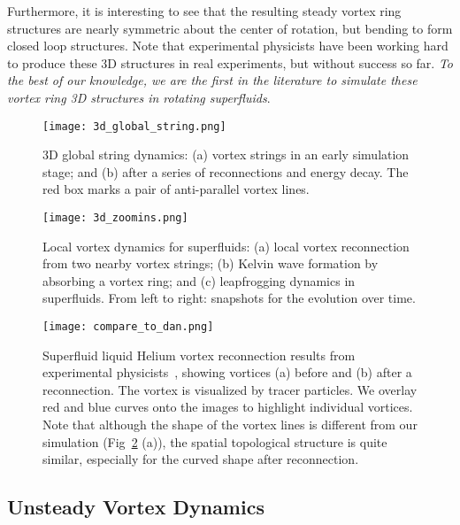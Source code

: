 \documentclass[10pt,journal,compsoc,twoside]{IEEEtran}
\newcommand{\bl}[1]{{\color{black}{#1}}}
\begin{document}
	Furthermore, it is interesting to see that the resulting steady vortex ring structures are nearly symmetric about the center of rotation, but bending to form closed loop structures.
	Note that experimental physicists have been working hard to produce these 3D structures in real experiments, but without success so far.
	\textit{To the best of our knowledge, we are the first in the literature to simulate these vortex ring 3D structures in rotating superfluids}.
	
	
	
	\begin{figure}[!t]
		\centering
		\texttt{[image: 3d\_global\_string.png]}
		\caption{3D global string dynamics:
			(a) vortex strings in an early simulation stage; and
			(b) after a series of reconnections and energy decay.
			The red box \bl{in (a)} marks a pair of anti-parallel vortex lines.}
		\label{fig:3d_global_string}
	\end{figure}
	
	\begin{figure}[!t]
		\centering
		\texttt{[image: 3d\_zoomins.png]}
		\caption{Local vortex dynamics for superfluids:
			(a) local vortex reconnection from two nearby vortex strings;
			(b) Kelvin wave formation by absorbing \bl{energy from} a vortex ring; and
			(c) leapfrogging dynamics in superfluids.
			From left to right: snapshots for the evolution over time.}
		\label{fig:3d_zoomins}
	\end{figure}
	
	\begin{figure}[!t]
		\centering
		\texttt{[image: compare\_to\_dan.png]}
		\caption{Superfluid liquid Helium vortex reconnection results from experimental physicists~\cite{Dan_14}, showing vortices (a) before and (b) after a reconnection.
			The vortex is visualized by tracer particles.
			We overlay red and blue curves onto the images to highlight individual vortices.
			Note that although the shape of the vortex lines is different from our simulation (Fig~\ref{fig:3d_zoomins} (a)), the spatial topological structure is quite similar, especially for the curved shape after reconnection.
		}
		\label{fig:compare_to_dan}
	\end{figure}
	
	
	

	\subsection{Unsteady Vortex Dynamics}
	\label{sec:unsteady_vortex_dyanmics}
	
\end{document}
